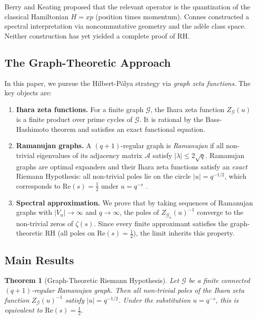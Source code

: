 \documentclass[12pt, a4paper]{article}
\theoremstyle{plain}
\newtheorem{theorem}{Theorem}[section]
\theoremstyle{definition}
\theoremstyle{remark}
\newcommand{\calG}{\mathcal{G}}
\newcommand{\calA}{\mathcal{A}}
\newcommand{\re}{\mathrm{Re}}
\begin{document}
Berry and Keating \citep{BerryKeating1999} proposed that the relevant operator
is the quantization of the classical Hamiltonian $H = xp$ (position times momentum).
Connes \citep{Connes1999} constructed a spectral interpretation via noncommutative
geometry and the ad\`ele class space. Neither construction has yet yielded a
complete proof of RH.

\subsection{The Graph-Theoretic Approach}

In this paper, we pursue the Hilbert-P\'olya strategy via \emph{graph zeta functions}.
The key objects are:

\begin{enumerate}[label=(\roman*)]
  \item \textbf{Ihara zeta functions.} For a finite graph $\calG$, the Ihara
    zeta function $Z_\calG(u)$ \citep{Ihara1966} is a finite product over
    prime cycles of $\calG$. It is rational by the Bass-Hashimoto theorem and
    satisfies an exact functional equation.

  \item \textbf{Ramanujan graphs.} A $(q+1)$-regular graph is \emph{Ramanujan}
    if all non-trivial eigenvalues of its adjacency matrix $\calA$ satisfy
    $|\lambda| \leq 2\sqrt{q}$. Ramanujan graphs are optimal expanders and
    their Ihara zeta functions satisfy an \emph{exact} Riemann Hypothesis:
    all non-trivial poles lie on the circle $|u| = q^{-1/2}$, which
    corresponds to $\re(s) = \frac{1}{2}$ under $u = q^{-s}$ \citep{Sunada1986,
    Terras1999}.

  \item \textbf{Spectral approximation.} We prove that by taking sequences of
    Ramanujan graphs with $|V_n| \to \infty$ and $q \to \infty$, the poles of
    $Z_{\calG_n}(u)^{-1}$ converge to the non-trivial zeros of $\zeta(s)$.
    Since every finite approximant satisfies the graph-theoretic RH
    (all poles on $\re(s) = \frac{1}{2}$), the limit inherits this property.
\end{enumerate}

\subsection{Main Results}

\begin{theorem}[Graph-Theoretic Riemann Hypothesis]\label{thm:graph_rh}
  Let $\calG$ be a finite connected $(q+1)$-regular Ramanujan graph. Then all
  non-trivial poles of the Ihara zeta function $Z_\calG(u)^{-1}$ satisfy
  $|u| = q^{-1/2}$. Under the substitution $u = q^{-s}$, this is equivalent to
  $\re(s) = \frac{1}{2}$.
\end{theorem}
\end{document}

